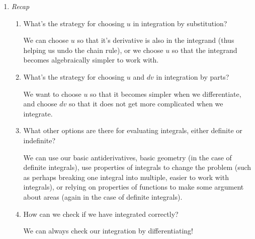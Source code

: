 \documentclass[main]{subfiles}
\begin{document}
\begin{enumerate}
\item \textit{Recap}
\begin{enumerate}
    \item 
    \begin{problem}[\vfill]
        What's the strategy for choosing $u$ in integration by substitution?
    \end{problem}

    \begin{solution}
        We can choose $u$ so that it's derivative is also in the integrand (thus helping us undo the chain rule), or we choose $u$ so that the integrand becomes algebraically simpler to work with.
    \end{solution}

    \item 
    \begin{problem}[\vfill]
        What's the strategy for choosing $u$ and $dv$ in integration by parts?
    \end{problem}

    \begin{solution}
     We want to choose $u$ so that it becomes simpler when we differentiate, and choose $dv$ so that it does not get more complicated when we integrate.      
    \end{solution}

    \item 
    \begin{problem}[\vfill]
        What other options are there for evaluating integrals,
        either definite or indefinite?
    \end{problem}

    \begin{solution}
       We can use our basic antiderivatives, basic geometry (in the case of definite integrals), use properties of integrals to change the problem (such as perhaps breaking one integral into multiple, easier to work with integrals), or relying on properties of functions to make some argument about areas (again in the case of definite integrals).
    \end{solution}

    \item 
    \begin{problem}[\vfill]
        How can we check if we have integrated correctly?
    \end{problem}

    \begin{solution}
        We can always check our integration by differentiating!
    \end{solution}
\end{enumerate}


\end{enumerate}
\end{document}

